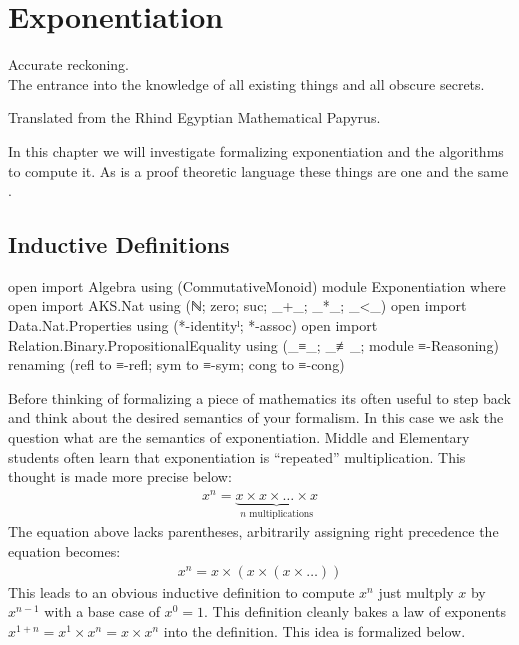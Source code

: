 \documentclass[./Thesis.tex]{subfiles}
\begin{document}
\chapter{Exponentiation}
\label{chap:exponentiation}

\epigraph{
  Accurate reckoning. \\
  The entrance into the knowledge of all existing
  things and all obscure secrets.
}{
  Translated from the Rhind Egyptian Mathematical Papyrus.
  \cite{rhind-papyrus}
}

In this chapter we will investigate formalizing exponentiation and the
algorithms to compute it. As \Agda{} is a proof theoretic language these things
are one and the same \cite{hott-book}.

\section{Inductive Definitions}
\label{sec:inductive-definitions}

\begin{code}[hide]
  open import Algebra using (CommutativeMonoid)
  module Exponentiation where
  open import AKS.Nat using (ℕ; zero; suc; _+_; _*_; _<_)
  open import Data.Nat.Properties using (*-identityˡ; *-assoc)
  open import Relation.Binary.PropositionalEquality using (_≡_; _≢_; module ≡-Reasoning) renaming (refl to ≡-refl; sym to ≡-sym; cong to ≡-cong)
\end{code}

Before thinking of formalizing a piece of mathematics its often useful to step
back and think about the desired semantics of your formalism. In this case we
ask the question what are the semantics of exponentiation. Middle and Elementary
students often learn that exponentiation is ``repeated'' multiplication. This
thought is made more precise below:
\begin{align*}
  x^n = \underbrace{x \times x \times \dots \times x}_{n \text{ multiplications}}
\end{align*}
The equation above lacks parentheses, arbitrarily assigning right precedence
the equation becomes:
\begin{align*}
  x^n = x \times (x \times (x \times \dots))
\end{align*}
This leads to an obvious inductive definition to compute $x^n$ just multply $x$
by $x^{n -1}$ with a base case of $x^0 = 1$. This definition cleanly bakes a law
of exponents $x^{1+n} = x^1 \times x^n = x \times x^n$ into the definition. This
idea is formalized below. \\
\end{document}
